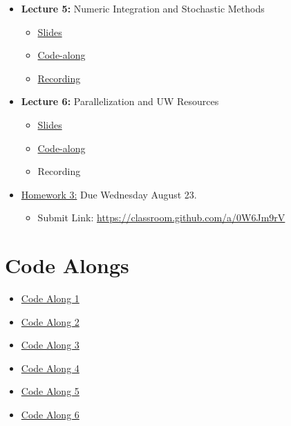 \documentclass[
]{book}
\providecommand{\tightlist}{%
  \setlength{\itemsep}{0pt}\setlength{\parskip}{0pt}}
\begin{document}
\begin{itemize}
\tightlist
\item
  \textbf{Lecture 5:} Numeric Integration and Stochastic Methods

  \begin{itemize}
  \tightlist
  \item
    \href{https://kevinghunt.github.io/ComputationCamp/lectures/Lecture5.html}{Slides}
  \item
    \href{https://kevinghunt.github.io/ComputationCamp/codealongs/CodeAlong5.jl}{Code-along}
  \item
    \href{https://uwmadison.zoom.us/rec/share/Rc-Mno_HDmfyakQGBhzxhbOjYIxXkX8ka4vkksy2p5Y-lxDZCJ2x08U8ja6LzMEV.54CVfkLcQhOLID_m}{Recording}
  \end{itemize}
\item
  \textbf{Lecture 6:} Parallelization and UW Resources

  \begin{itemize}
  \tightlist
  \item
    \href{https://kevinghunt.github.io/ComputationCamp/lectures/Lecture6.html}{Slides}
  \item
    \href{https://kevinghunt.github.io/ComputationCamp/codealongs/CodeAlong6.jl}{Code-along}
  \item
    Recording
  \end{itemize}
\item
  \href{https://kevinghunt.github.io/ComputationCamp/homeworks/homework3.html}{Homework 3:} Due Wednesday August 23.

  \begin{itemize}
  \tightlist
  \item
    Submit Link: \url{https://classroom.github.com/a/0W6Jm9rV}
  \end{itemize}
\end{itemize}

\hypertarget{code-alongs}{%
\chapter{Code Alongs}\label{code-alongs}}

\begin{itemize}
\tightlist
\item
  \href{https://kevinghunt.github.io/ComputationCamp/codealongs/CodeAlong1.jl}{Code Along 1}
\item
  \href{https://kevinghunt.github.io/ComputationCamp/codealongs/CodeAlong2.jl}{Code Along 2}
\item
  \href{https://kevinghunt.github.io/ComputationCamp/codealongs/CodeAlong3.jl}{Code Along 3}
\item
  \href{https://kevinghunt.github.io/ComputationCamp/codealongs/CodeAlong4.jl}{Code Along 4}
\item
  \href{https://kevinghunt.github.io/ComputationCamp/codealongs/CodeAlong5.jl}{Code Along 5}
\item
  \href{https://kevinghunt.github.io/ComputationCamp/codealongs/CodeAlong6.jl}{Code Along 6}
\end{itemize}

  
\end{document}
